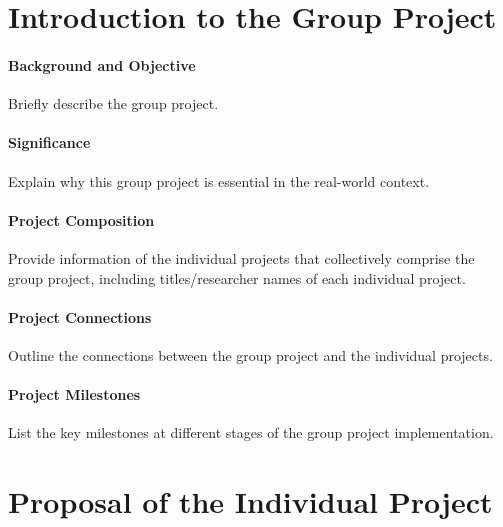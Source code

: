 \documentclass[12pt]{article}
\newenvironment{subs}{\adjustwidth{3em}{0pt}}{\endadjustwidth}
\begin{document}


\newpage
\tableofcontents
{}
\setcounter{page}{2}
\newpage

\setcounter{page}{1}

\part{Introduction to the Group Project}
\setcounter{section}{1}
\subsection{Background and Objective}
\begin{subs}
Briefly describe the group project.
\end{subs}

\subsection{Significance}
\begin{subs}
Explain why this group project is essential in the real-world context.
\end{subs}

\subsection{Project Composition}
\begin{subs}
Provide information of the individual projects that collectively comprise the group project, including titles/researcher names of each individual project.
\end{subs}

\subsection{Project Connections}
\begin{subs}
Outline the connections between the group project and the individual projects.
\end{subs}

\subsection{Project Milestones}
\begin{subs}
List the key milestones at different stages of the group project implementation.
\end{subs}

\part{Proposal of the Individual Project}
\setcounter{section}{2}
\setcounter{subsection}{0}
\end{document}
